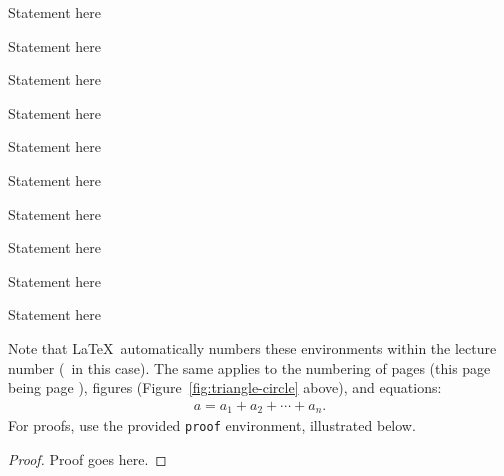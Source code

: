 \documentclass[usletter]{article}
\begin{document}
\begin{proposition}
Statement here
\end{proposition}

\begin{fact}
Statement here
\end{fact}

\begin{claim}
Statement here
\end{claim}

\begin{definition}
Statement here
\end{definition}

\begin{example}
Statement here
\end{example}

\begin{assumption}
Statement here
\end{assumption}

\begin{remark}
Statement here
\end{remark}

\begin{conjecture}
Statement here
\end{conjecture}

\begin{openproblem}
Statement here
\end{openproblem}

\begin{problem}
Statement here
\end{problem}


\noindent
Note that \LaTeX\ automatically numbers these
environments within the lecture number (\thelecture\ in
this case).  The same applies to the numbering of pages
(this page being page \thepage), figures
(Figure~\ref{fig:triangle-circle} above), and
equations:
\begin{align}
a = a_1+a_2+\cdots+a_n.
\end{align}
\noindent
For proofs, use the provided {\tt proof} environment,
illustrated below.

\begin{proof}
Proof goes here.
\end{proof}




\end{document}

